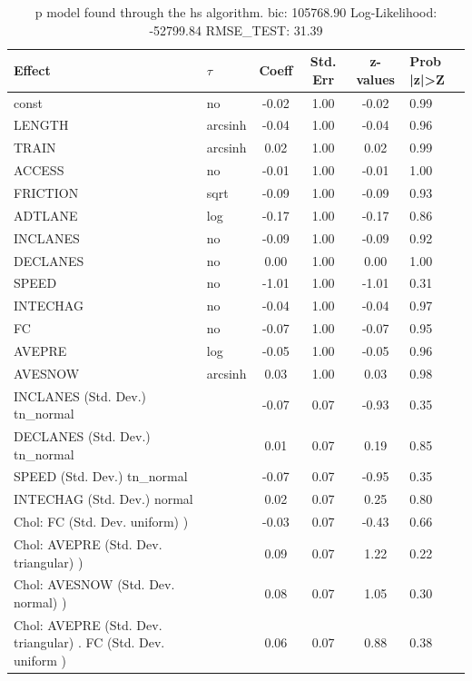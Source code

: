 \begin{table}
	\caption{p model found through the hs algorithm. bic: 105768.90 Log-Likelihood: -52799.84 RMSE_TEST: 31.39}
	\begin{center}
		\begin{tabular}{|l|l|c|c|c|l|}
			\hline
			Effect & $\tau$ & Coeff & Std. Err & z-values & Prob |z|>Z \\
			\hline
			const & no & -0.02 & 1.00 & -0.02 & 0.99 \\
			\hline
			LENGTH & arcsinh & -0.04 & 1.00 & -0.04 & 0.96 \\
			\hline
			TRAIN & arcsinh & 0.02 & 1.00 & 0.02 & 0.99 \\
			\hline
			ACCESS & no & -0.01 & 1.00 & -0.01 & 1.00 \\
			\hline
			FRICTION & sqrt & -0.09 & 1.00 & -0.09 & 0.93 \\
			\hline
			ADTLANE & log & -0.17 & 1.00 & -0.17 & 0.86 \\
			\hline
			INCLANES & no & -0.09 & 1.00 & -0.09 & 0.92 \\
			\hline
			DECLANES & no & 0.00 & 1.00 & 0.00 & 1.00 \\
			\hline
			SPEED & no & -1.01 & 1.00 & -1.01 & 0.31 \\
			\hline
			INTECHAG & no & -0.04 & 1.00 & -0.04 & 0.97 \\
			\hline
			FC & no & -0.07 & 1.00 & -0.07 & 0.95 \\
			\hline
			AVEPRE & log & -0.05 & 1.00 & -0.05 & 0.96 \\
			\hline
			AVESNOW & arcsinh & 0.03 & 1.00 & 0.03 & 0.98 \\
			\hline
			INCLANES (Std. Dev.) tn_normal &  & -0.07 & 0.07 & -0.93 & 0.35 \\
			\hline
			DECLANES (Std. Dev.) tn_normal &  & 0.01 & 0.07 & 0.19 & 0.85 \\
			\hline
			SPEED (Std. Dev.) tn_normal &  & -0.07 & 0.07 & -0.95 & 0.35 \\
			\hline
			INTECHAG (Std. Dev.) normal &  & 0.02 & 0.07 & 0.25 & 0.80 \\
			\hline
			 Chol: FC (Std. Dev. uniform) ) &  & -0.03 & 0.07 & -0.43 & 0.66 \\
			\hline
			 Chol: AVEPRE (Std. Dev. triangular) ) &  & 0.09 & 0.07 & 1.22 & 0.22 \\
			\hline
			 Chol: AVESNOW (Std. Dev. normal) ) &  & 0.08 & 0.07 & 1.05 & 0.30 \\
			\hline
			 Chol: AVEPRE (Std. Dev. triangular) . FC (Std. Dev.   uniform ) &  & 0.06 & 0.07 & 0.88 & 0.38 \\

\end{tabular}
\end{center}
\end{table}
